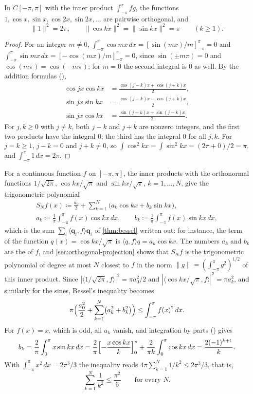 \begin{proposition}
\label{prop:trig-orthogonal}
In $C[-\pi,\pi]$ with the inner product $\int_{-\pi}^\pi fg$, the functions $1,\cos x,\sin x,\cos2x,\sin2x,\ldots$ are pairwise orthogonal, and
\[
\|1\|^2=2\pi,\qquad\|\cos kx\|^2=\|\sin kx\|^2=\pi\qquad(k\ge1).
\]
\end{proposition}

\begin{proof}
For an integer $m\ne0$, $\int_{-\pi}^\pi\cos mx\,dx=[\sin(mx)/m]_{-\pi}^{\pi}=0$ and $\int_{-\pi}^\pi\sin mx\,dx=[-\cos(mx)/m]_{-\pi}^{\pi}=0$, since $\sin(\pm m\pi)=0$ and $\cos(m\pi)=\cos(-m\pi)$; for $m=0$ the second integral is $0$ as well. By the addition formulas (),
\[
\begin{aligned}
\cos jx\cos kx&=\frac{\cos(j-k)x+\cos(j+k)x}2,\\
\sin jx\sin kx&=\frac{\cos(j-k)x-\cos(j+k)x}2,\\
\sin jx\cos kx&=\frac{\sin(j+k)x+\sin(j-k)x}2 .
\end{aligned}
\]
For $j,k\ge0$ with $j\ne k$, both $j-k$ and $j+k$ are nonzero integers, and the first two products have the integral $0$; the third has the integral $0$ for all $j,k$. For $j=k\ge1$, $j-k=0$ and $j+k\ne0$, so $\int\cos^2kx=\int\sin^2kx=(2\pi+0)/2=\pi$, and $\int_{-\pi}^\pi1\,dx=2\pi$.
\end{proof}

For a continuous function $f$ on $[-\pi,\pi]$, the inner products with the orthonormal functions $1/\sqrt{2\pi}$, $\cos kx/\sqrt\pi$ and $\sin kx/\sqrt\pi$, $k=1,\ldots,N$, give the trigonometric polynomial
\[
\begin{gathered}
S_Nf(x)\coloneqq\frac{a_0}2+\sum_{k=1}^N\bigl(a_k\cos kx+b_k\sin kx\bigr),\\
a_k\coloneqq\frac1\pi\int_{-\pi}^\pi f(x)\cos kx\,dx,\qquad b_k\coloneqq\frac1\pi\int_{-\pi}^\pi f(x)\sin kx\,dx,
\end{gathered}
\]
which is the sum $\sum_i\langle\mathbf q_i,f\rangle\mathbf q_i$ of \cref{thm:bessel} written out: for instance, the term of the function $q(x)=\cos kx/\sqrt\pi$ is $\langle q,f\rangle q=a_k\cos kx$. The numbers $a_k$ and $b_k$ are the  of $f$, and \cref{sec:orthogonal-projection} shows that $S_Nf$ is the trigonometric polynomial of degree at most $N$ closest to $f$ in the norm $\|g\|=(\int_{-\pi}^\pi g^2)^{1/2}$ of this inner product. Since $|\langle1/\sqrt{2\pi},f\rangle|^2=\pi a_0^2/2$ and $|\langle\cos kx/\sqrt\pi,f\rangle|^2=\pi a_k^2$, and similarly for the sines, Bessel's inequality becomes
\[
\pi\Bigl(\frac{a_0^2}2+\sum_{k=1}^N\bigl(a_k^2+b_k^2\bigr)\Bigr)\le\int_{-\pi}^\pi f(x)^2\,dx .
\]
For $f(x)=x$, which is odd, all $a_k$ vanish, and integration by parts () gives
\[
b_k=\frac2\pi\int_0^\pi x\sin kx\,dx=\frac2\pi\Bigl[-\frac{x\cos kx}k\Bigr]_0^\pi+\frac2{\pi k}\int_0^\pi\cos kx\,dx=\frac{2(-1)^{k+1}}k .
\]
With $\int_{-\pi}^\pi x^2\,dx=2\pi^3/3$ the inequality reads $4\pi\sum_{k=1}^N1/k^2\le2\pi^3/3$, that is,
\[
\sum_{k=1}^N\frac1{k^2}\le\frac{\pi^2}6\qquad\text{for every }N .
\]

